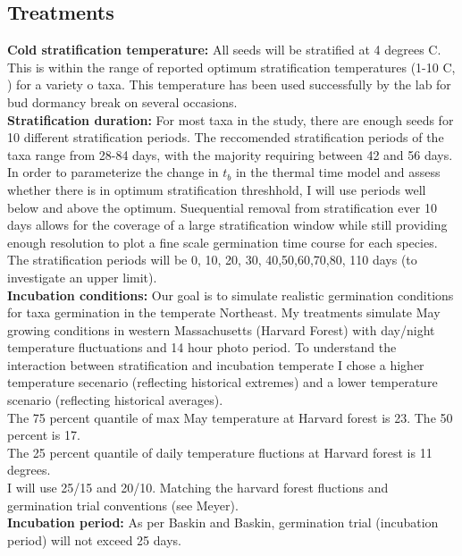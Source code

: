 \documentclass{article}\usepackage[]{graphicx}\usepackage[]{color}
\begin{document}
\subsection*{Treatments}
\textbf{Cold stratification temperature:} All seeds will be stratified at 4 degrees C. This is within the range of reported optimum stratification temperatures (1-10 C, \citep{Bewley2013}) for a variety o taxa. This temperature has been used successfully by the lab for bud dormancy break on several occasions.\\
\textbf{Stratification duration:} For most taxa in the study, there are enough seeds for 10 different stratification periods. The reccomended stratification periods of the taxa range from 28-84 days, with the majority requiring between 42 and 56 days. In order to parameterize the change in $t_b$ in the thermal time model and assess whether there is in optimum stratification threshhold, I will use periods well below and above the optimum. Suequential removal from stratification ever 10 days allows for the coverage of a large stratification window while still providing enough resolution to plot a fine scale germination time course for each species. The stratification periods will be 0, 10, 20, 30, 40,50,60,70,80, 110 days (to investigate an upper limit).\\
\textbf{Incubation conditions:} Our goal is to simulate realistic germination conditions for taxa germination in the temperate Northeast. My treatments simulate May growing conditions in western Massachusetts (Harvard Forest) with day/night temperature fluctuations and 14 hour photo period. To understand the interaction between stratification and incubation temperate I chose a higher temperature secenario (reflecting historical extremes) and a lower temperature scenario (reflecting historical averages).\\
The 75 percent quantile of max May temperature at Harvard forest is 23. The 50 percent is 17.\\
The 25 percent quantile of daily temperature fluctions at Harvard forest is 11 degrees.\\
I will use 25/15 and 20/10. Matching the harvard forest fluctions and germination trial conventions (see Meyer).\\

\textbf{Incubation period:} As per Baskin and Baskin, germination trial (incubation period) will not exceed 25 days.\\
\end{document}
